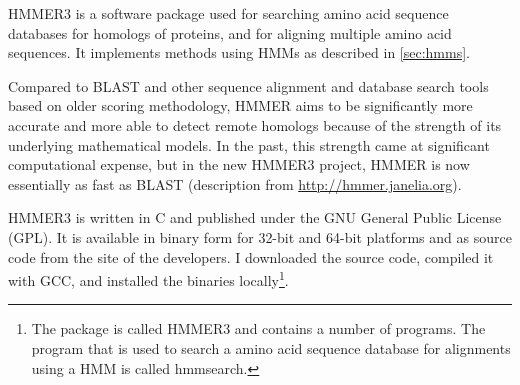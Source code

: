 HMMER3  \citep{eddy2011} is a software package used for searching amino acid
sequence databases for homologs of proteins, and for aligning multiple amino
acid sequences. It implements methods using HMMs as described in
\autoref{sec:hmms}.

Compared to BLAST and other sequence alignment and database search tools based
on older scoring methodology, HMMER aims to be significantly more accurate and
more able to detect remote homologs because of the strength of its underlying
mathematical models. In the past, this strength came at significant
computational expense, but in the new HMMER3 project, HMMER is now essentially
as fast as BLAST (description from \url{http://hmmer.janelia.org}).

HMMER3 is written in C and published under the GNU General Public License (GPL).
It is available in binary form for 32-bit and 64-bit platforms and as source
code from the site of the developers. I downloaded the source code, compiled it
with GCC, and installed the binaries locally\footnote{The package is called
HMMER3 and contains a number of programs. The program that is used to search a
amino acid sequence database for alignments using a HMM is called hmmsearch.}. 

